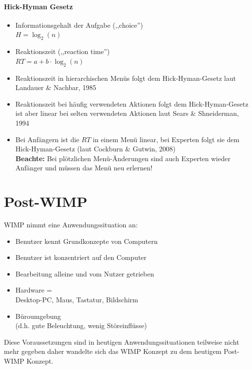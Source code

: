 \documentclass[8pt,a4paper,landscape]{extarticle}
\begin{document}
\begin{multicols*}{4}
	\paragraph{Hick-Hyman Gesetz}
	\begin{itemize}
		\item Informationsgehalt der Aufgabe (,,choice'')\\
		      \(H = \log_{2}(n)\)
		\item Reaktionszeit (,,reaction time'')\\
		      \(RT = a + b \cdot \log_{2}(n)\)
		\item Reaktionszeit in hierarchischen Menüs folgt dem Hick-Hyman-Gesetz
		      laut Landauer \& Nachbar, 1985
		\item Reaktionszeit bei häufig verwendeten Aktionen folgt dem
		      Hick-Hyman-Gesetz ist aber linear bei selten verwendeten Aktionen
		      laut Sears \& Shneiderman, 1994
		\item Bei Anfängern ist die \(RT\) in einem Menü linear, bei Experten
		      folgt sie dem Hick-Hyman-Gesetz (laut Cockburn \& Gutwin, 2008) \\
		      \textbf{Beachte:} Bei plötzlichen Menü-Änderungen sind auch
		      Experten wieder Anfänger und müssen das Menü neu erlernen!
	\end{itemize}
	\section{Post-WIMP}
	WIMP nimmt eine Anwendungssituation an:
	\begin{itemize}
		\item Benutzer kennt Grundkonzepte von Computern
		\item Benutzer ist konzentriert auf den Computer
		\item Bearbeitung alleine und vom Nutzer getrieben
		\item Hardware = \\ Desktop-PC, Maus, Tastatur, Bildschirm
		\item Büroumgebung \\ (d.h. gute Beleuchtung, wenig Störeinflüsse)
	\end{itemize}
	Diese Voraussetzungen sind in heutigen Anwendungssituationen teilweise nicht
	mehr gegeben daher wandelte sich das WIMP Konzept zu dem heutigem Post-WIMP
	Konzept.

\end{multicols*}
\end{document}
